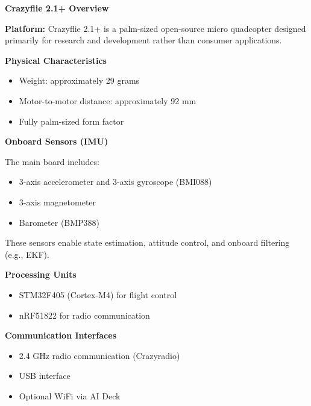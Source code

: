 \documentclass{book}
\providecommand{\ProjectDeepHeading}[2]{%
    \par\medskip\noindent\textbf{#2}\par\smallskip
}
\begin{document}

\ProjectDeepHeading{5}{Crazyflie 2.1+ Overview}
        
        \textbf{Platform:} Crazyflie 2.1+ is a palm-sized open-source micro quadcopter designed primarily for research and development rather than consumer applications.
        
        \ProjectDeepHeading{6}{Physical Characteristics}
            
            \begin{itemize}
                \item Weight: approximately 29 grams
                \item Motor-to-motor distance: approximately 92 mm
                \item Fully palm-sized form factor
            \end{itemize}
        
        \ProjectDeepHeading{6}{Onboard Sensors (IMU)}
            
            The main board includes:
            
            \begin{itemize}
                \item 3-axis accelerometer and 3-axis gyroscope (BMI088)
                \item 3-axis magnetometer
                \item Barometer (BMP388)
            \end{itemize}
            
            These sensors enable state estimation, attitude control, and onboard filtering (e.g., EKF).
        
        \ProjectDeepHeading{6}{Processing Units}
            
            \begin{itemize}
                \item STM32F405 (Cortex-M4) for flight control
                \item nRF51822 for radio communication
            \end{itemize}
        
        \ProjectDeepHeading{6}{Communication Interfaces}
            
            \begin{itemize}
                \item 2.4 GHz radio communication (Crazyradio)
                \item USB interface
                \item Optional WiFi via AI Deck
            \end{itemize}
        
\end{document}
